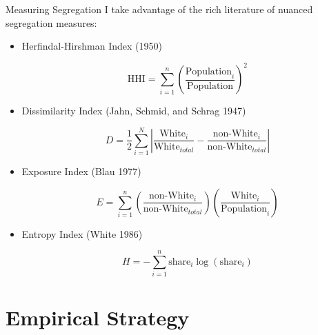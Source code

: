 \documentclass{beamer}
\begin{document}
\begin{frame}[allowframebreaks]{Measuring Segregation}
    I take advantage of the rich literature of nuanced segregation measures:
    \begin{itemize}
        \item Herfindal-Hirshman Index (1950)

        \begin{equation}
    \text{HHI}=\sum_{i=1}^n \left(\frac{\text{Population}_i}{\text{Population}}\right)^2
\end{equation}

        \item Dissimilarity Index (Jahn, Schmid, and Schrag 1947)

        \begin{equation}
    D=\frac{1}{2}\sum_{i=1}^N\left|\frac{\text{White}_i}{\text{White}_{total}}-\frac{\text{non-White}_i}{\text{non-White}_{total}}\right|
\end{equation}
\framebreak
        \item Exposure Index (Blau 1977)

        \begin{equation}
    E=\sum_{i=1}^n\left(\frac{\text{non-White}_i}{\text{non-White}_{total}}\right)\left(\frac{\text{White}_i}{\text{Population}_{i}}\right)
\end{equation}

        \item Entropy Index (White 1986)

        \begin{equation}
    H=-\sum_{i=1}^n\text{share}_i \log(\text{share}_i)
\end{equation}
    \end{itemize}
\end{frame}

\section{Empirical Strategy}
\end{document}
